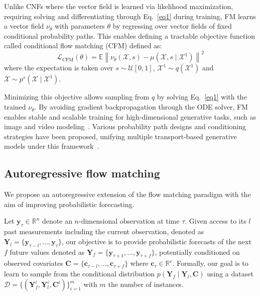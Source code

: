 \documentclass[preprint,12pt,authoryear]{elsarticle}
\begin{document}
Unlike CNFs where the vector field is learned via likelihood maximization, requiring solving and differentiating through Eq.~\eqref{eq1} during training, FM learns a vector field $\nu_\theta$ with parameters $\theta$ by regressing over vector fields of fixed conditional probability paths. 
This enables defining a tractable objective function called conditional flow matching (CFM) defined as:
\begin{equation}\label{eq:cfm}
\mathcal{L}_{\text{CFM}}(\theta) = \mathbb{E} \left\| \nu_{\theta}(\mathcal{X}, s) - \mu(\mathcal{X}, s\mid \mathcal{X}^1)\right\|^2
\end{equation}
where the expectation is taken over $s \sim \mathcal{U}[0, 1]$, $ \mathcal{X}^1 \sim q(\mathcal{X}^1)$ and $\mathcal{X} \sim p^s(\mathcal{X} \mid \mathcal{X}^1)$.

Minimizing this objective allows sampling from $q$ by solving Eq.~\eqref{eq1} with the trained $\nu_\theta$. By avoiding gradient backpropagation through the ODE solver, FM enables stable and scalable training for high-dimensional generative tasks, such as image and video modeling~\citep{esser2024scaling, polyak2024movie}. Various probability path designs and conditioning strategies have been proposed, unifying multiple transport-based generative models under this framework~\citep{liu2022flow, albergo2023stochastic, tong2023improving}.

\subsection{Autoregressive flow matching}
\label{sec:AFM}

We propose an autoregressive extension of the flow matching paradigm with the aim of improving probabilistic forecasting. 

Let $\mathbf{y}_\tau \in \mathbb{R}^n$ denote an $n$-dimensional observation at time $\tau$. Given access to its $l$ past measurements including the current observation, denoted as $\mathbf{Y}_l = \{\mathbf{y}_{\tau - l}, \ldots, \mathbf{y}_{\tau}\}$, our objective is to provide probabilistic forecasts of the next $f$ future values denoted as $\mathbf{Y}_f = \{\mathbf{y}_{\tau+1}, \ldots, \mathbf{y}_{\tau+f}\}$, potentially conditioned on observed covariates $\mathbf{C} = \{\mathbf{c}_{\tau - l}, \ldots,\mathbf{c}_{\tau+f}\}$ where $\mathbf{c}_\tau \in \mathbb{R}^c$. Formally, our goal is to learn to sample from the conditional distribution $p(\mathbf{Y}_f \mid \mathbf{Y}_l, \mathbf{C})$ using a dataset $\mathcal{D}=\{(\mathbf{Y}^i_f, \mathbf{Y}^i_l, \mathbf{C}^i)\}_{i=1}^{m}$ with $m$ the number of instances.
\end{document}
